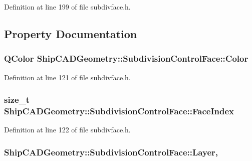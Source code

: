 Definition at line 199 of file subdivface.\-h.



\subsection{Property Documentation}
\hypertarget{classShipCADGeometry_1_1SubdivisionControlFace_a07b00d2ff994f882f1032c4a0cf2a288}{
\subsubsection[{Color}]{\setlength{\rightskip}{0pt plus 5cm}Q\-Color Ship\-C\-A\-D\-Geometry\-::\-Subdivision\-Control\-Face\-::\-Color\hspace{0.3cm}{\ttfamily [read]}}}\label{classShipCADGeometry_1_1SubdivisionControlFace_a07b00d2ff994f882f1032c4a0cf2a288}


Definition at line 121 of file subdivface.\-h.

\hypertarget{classShipCADGeometry_1_1SubdivisionControlFace_aecc2c63e4f1cc923ca3df91664c7f2ce}{
\subsubsection[{Face\-Index}]{\setlength{\rightskip}{0pt plus 5cm}size\-\_\-t Ship\-C\-A\-D\-Geometry\-::\-Subdivision\-Control\-Face\-::\-Face\-Index\hspace{0.3cm}{\ttfamily [read]}}}\label{classShipCADGeometry_1_1SubdivisionControlFace_aecc2c63e4f1cc923ca3df91664c7f2ce}


Definition at line 122 of file subdivface.\-h.

\hypertarget{classShipCADGeometry_1_1SubdivisionControlFace_a7b41fc40b007567fefacc523bd1454f0}{
\subsubsection[{Layer}]{ Ship\-C\-A\-D\-Geometry\-::\-Subdivision\-Control\-Face\-::\-Layer\hspace{0.3cm}{\ttfamily [read]}, {\ttfamily [write]}}}\label{classShipCADGeometry_1_1SubdivisionControlFace_a7b41fc40b007567fefacc523bd1454f0}


